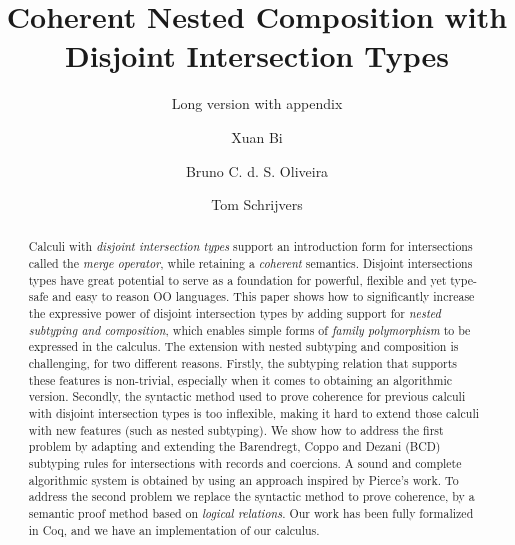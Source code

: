 \documentclass[oribibl]{llncs}
\begin{document}
\title{Coherent Nested Composition with Disjoint Intersection Types}

\ifdefined\submitoption
\subtitle{Long version with appendix}
\fi


\author{Xuan Bi  \and Bruno C. d. S. Oliveira  \and Tom Schrijvers}


\maketitle


\begin{abstract}
Calculi with \emph{disjoint intersection types} support an introduction form
for intersections called the
\emph{merge operator}, while retaining a \emph{coherent} semantics.
Disjoint intersections types have great potential to
serve as a foundation for powerful, flexible and yet type-safe and
easy to reason OO languages. This paper shows how to significantly
increase the expressive power of disjoint intersection types by
adding support for \emph{nested subtyping and composition}, which 
enables simple forms of \emph{family polymorphism} to be expressed in the calculus. 
The extension with nested subtyping and
composition is challenging, for two different reasons. Firstly, the
subtyping relation that supports these features is non-trivial,
especially when it comes to obtaining an algorithmic version. Secondly,
the syntactic method used to prove coherence for previous calculi with disjoint
intersection types is too inflexible, making it hard to
extend those calculi with new features (such as nested subtyping).
We show how to address the first problem by adapting and extending
 the Barendregt, Coppo and Dezani (BCD) subtyping rules for intersections
with records and coercions. A sound and complete algorithmic
system is obtained by using an approach inspired by Pierce's
work. To address the second
problem we replace the syntactic method to prove coherence,
by a semantic proof method based on \emph{logical relations}.
Our work has been fully formalized in Coq, and we have an implementation
of our calculus.
\end{abstract}







% 




\newpage

\def\bibfont{\small}



\ifdefined\submitoption
\newpage
\appendix

\fi
\end{document}
